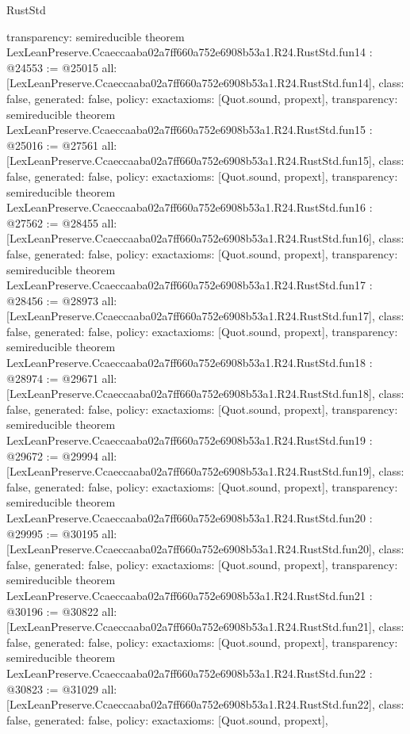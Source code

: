 \begin{lexlean}{RustStd}
\begin{coremodule}
{  transparency: semireducible
}
theorem LexLeanPreserve.Ccaeccaaba02a7ff660a752e6908b53a1.R24.RustStd.fun14 : @24553 := @25015 {
  all: [LexLeanPreserve.Ccaeccaaba02a7ff660a752e6908b53a1.R24.RustStd.fun14],
  class: false,
  generated: false,
  policy: exact{axioms: [Quot.sound, propext]},
  transparency: semireducible
}
theorem LexLeanPreserve.Ccaeccaaba02a7ff660a752e6908b53a1.R24.RustStd.fun15 : @25016 := @27561 {
  all: [LexLeanPreserve.Ccaeccaaba02a7ff660a752e6908b53a1.R24.RustStd.fun15],
  class: false,
  generated: false,
  policy: exact{axioms: [Quot.sound, propext]},
  transparency: semireducible
}
theorem LexLeanPreserve.Ccaeccaaba02a7ff660a752e6908b53a1.R24.RustStd.fun16 : @27562 := @28455 {
  all: [LexLeanPreserve.Ccaeccaaba02a7ff660a752e6908b53a1.R24.RustStd.fun16],
  class: false,
  generated: false,
  policy: exact{axioms: [Quot.sound, propext]},
  transparency: semireducible
}
theorem LexLeanPreserve.Ccaeccaaba02a7ff660a752e6908b53a1.R24.RustStd.fun17 : @28456 := @28973 {
  all: [LexLeanPreserve.Ccaeccaaba02a7ff660a752e6908b53a1.R24.RustStd.fun17],
  class: false,
  generated: false,
  policy: exact{axioms: [Quot.sound, propext]},
  transparency: semireducible
}
theorem LexLeanPreserve.Ccaeccaaba02a7ff660a752e6908b53a1.R24.RustStd.fun18 : @28974 := @29671 {
  all: [LexLeanPreserve.Ccaeccaaba02a7ff660a752e6908b53a1.R24.RustStd.fun18],
  class: false,
  generated: false,
  policy: exact{axioms: [Quot.sound, propext]},
  transparency: semireducible
}
theorem LexLeanPreserve.Ccaeccaaba02a7ff660a752e6908b53a1.R24.RustStd.fun19 : @29672 := @29994 {
  all: [LexLeanPreserve.Ccaeccaaba02a7ff660a752e6908b53a1.R24.RustStd.fun19],
  class: false,
  generated: false,
  policy: exact{axioms: [Quot.sound, propext]},
  transparency: semireducible
}
theorem LexLeanPreserve.Ccaeccaaba02a7ff660a752e6908b53a1.R24.RustStd.fun20 : @29995 := @30195 {
  all: [LexLeanPreserve.Ccaeccaaba02a7ff660a752e6908b53a1.R24.RustStd.fun20],
  class: false,
  generated: false,
  policy: exact{axioms: [Quot.sound, propext]},
  transparency: semireducible
}
theorem LexLeanPreserve.Ccaeccaaba02a7ff660a752e6908b53a1.R24.RustStd.fun21 : @30196 := @30822 {
  all: [LexLeanPreserve.Ccaeccaaba02a7ff660a752e6908b53a1.R24.RustStd.fun21],
  class: false,
  generated: false,
  policy: exact{axioms: [Quot.sound, propext]},
  transparency: semireducible
}
theorem LexLeanPreserve.Ccaeccaaba02a7ff660a752e6908b53a1.R24.RustStd.fun22 : @30823 := @31029 {
  all: [LexLeanPreserve.Ccaeccaaba02a7ff660a752e6908b53a1.R24.RustStd.fun22],
  class: false,
  generated: false,
  policy: exact{axioms: [Quot.sound, propext]},
}
\end{coremodule}
\end{lexlean}
